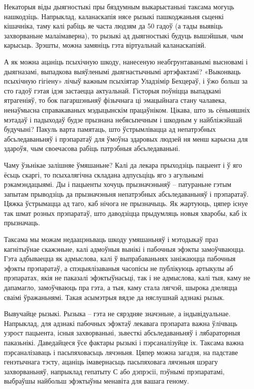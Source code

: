 Некаторыя віды дыягностыкі пры бяздумным выкарыстаньні таксама могуць нашкодзіць. Напрыклад, каланаскапія нясе рызыкі пашкоджаньня сьценкі кішачніка, таму калі рабіць яе часта людзям да 50 гадоў (а тады выявіць захворваньне малаімаверна), то рызыкі ад дыягностыкі будуць вышэйшыя, чым карысьць. Зрэшты, можна замяніць гэта віртуальнай каланаскапіяй.

А як можна ацаніць псыхічную шкоду, нанесеную неабгрунтаванымі высновамі і дыягназамі, выпадкова выяўленымі дыягнастычнымі артэфактамі? «Выконваць псыхічную гігіену» лічыў важным псыхіятар Уладзімір Бехцераў, і ўжо больш за сто гадоў гэтая ідэя застаецца актуальнай. Гісторыя поўніцца выпадкамі ятрагеніяў, то бок пагаршэньняў фізычнага ці эмацыйнага стану чалавека, ненаўмысна справакаваных мэдыцынскім працаўніком. Цікава, што зь сёньняшніх мэтадаў і падыходаў будзе прызнана небясьпечным і шкодным у найбліжэйшай будучыні? Пакуль варта памятаць, што ўстрымлівацца ад непатрэбных абсьледаваньняў і прэпаратаў для ўмоўна здаровых людзей ня менш карысна для здароўя, чым своечасова рабіць патрэбныя абсьледаваньні.

Чаму ўзьнікае залішняе ўмяшаньне? Калі да лекара прыходзіць пацыент і ў яго ёсьць скаргі, то псыхалягічна складана адпусьціць яго з агульнымі рэкамэндацыямі. Ды і пацыенты хочуць прызначэньняў – патураньне гэтым запытам прыводзіць да прызначэньня непатрэбных абсьледаваньняў і прэпаратаў. Цяжка ўстрымацца ад таго, каб нічога не прызначыць. Як жартуюць, цяпер існуе так шмат розных прэпаратаў, што даводзіцца прыдумляць новыя хваробы, каб іх прызначаць.

Таксама мы можам недаацэньваць шкоду умяшаньняў і мэтодыкаў праз кагнітыўнае скажэньне, калі адмоўныя вынікі і пабочныя эфэкты замоўчваюцца. Гэта адбываецца як адмыслова, калі ў выпрабаваньнях заніжаюцца пабочныя эфэкты прэпаратаў, а спэцыялізаваныя часопісы не публікуюць артыкулы аб прэпаратах, якія не паказалі эфэктыўнасьці, так і не адмыслова, калі тыя, каму не дапамагло, замоўчваюць пра гэта, а тыя, каму стала лягчэй, шырока дзеляцца сваімі ўражаньнямі. Такая асымэтрыя вядзе да няслушнай адзнакі рызык.

Вывучайце рызыкі. Рызыка – гэта не сярэдняе значэньне, а індывідуальнае. Напрыклад, для адзнакі пабочных эфэктаў лекавага прэпарата важна ўлічваць узрост пацыента, існыя захворваньні, зьвесткі абсьледаваньняў і лябараторныя паказьнікі. Даведайцеся ўсе фактары рызыкі і пэрсаналізуйце іх. Таксама важна пэрсаналізаваць і пасьпяховасьць лячэньня. Цяпер можна загадзя, на падставе генэтычнага тэсту, ацаніць імавернасьць пасьпяховага лячэньня шэрагу захворваньняў, напрыклад гепатыту С або дэпрэсіі, пэўнымі прэпаратамі, выбраўшы найбольш эфэктыўны менавіта для вашага геному.

